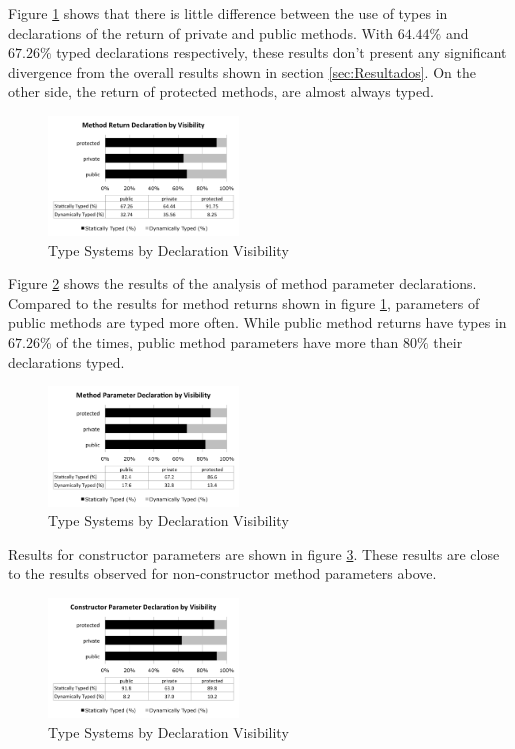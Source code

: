 \documentclass[preprint]{sigplanconf}
\begin{document}
Figure \ref{fig:method_return_visibility} shows that there is little difference between the use of types in declarations of the return of private and public methods. 
With $64.44\%$ and $67.26\%$ typed declarations respectively, these results don't present any significant divergence from the overall results shown in section \ref{sec:Resultados}.
On the other side, the return of protected methods, are almost always typed.

\begin{figure}[ht]
\centering \includegraphics[width=0.45\textwidth]{images/method_return_visibility} 
\caption{Type Systems by Declaration Visibility}
\label{fig:method_return_visibility} 
\end{figure}

Figure \ref{fig:method_parameter_visibility} shows the results of the analysis of method parameter declarations. 
Compared to the results for method returns shown in figure \ref{fig:method_return_visibility}, parameters of public methods are typed more often.
While public method returns have types in $67.26\%$ of the times, public method parameters have more than $80\%$ their declarations typed.

\begin{figure}[ht]
\centering \includegraphics[width=0.45\textwidth]{images/method_parameter_visibility} 
\caption{Type Systems by Declaration Visibility}
\label{fig:method_parameter_visibility} 
\end{figure}

Results for constructor parameters are shown in figure \ref{fig:constructor_parameter_visibility}.
These results are close to the results observed for non-constructor method parameters above. 

\begin{figure}[ht]
\centering \includegraphics[width=0.45\textwidth]{images/constructor_parameter_visibility} 
\caption{Type Systems by Declaration Visibility}
\label{fig:constructor_parameter_visibility} 
\end{figure}
\end{document}
